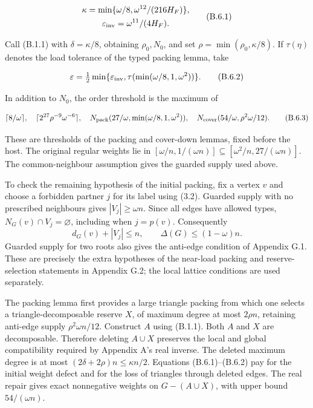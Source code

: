 \documentclass[english,11pt,a4paper]{article}
\begin{document}
\[\begin{gathered}
\kappa=\min\{\omega/8,\omega^{12}/(216H_F)\},\\
\varepsilon_{\rm inv}=\omega^{11}/(4H_F).
\end{gathered}
\tag{B.6.1}\]

Call (B.1.1) with \(\delta=\kappa/8\), obtaining \(\rho_0,N_0\), and set \(\rho=\min(\rho_0,\kappa/8)\). If \(\tau(\eta)\) denotes the load tolerance of the typed packing lemma, take

\[\varepsilon=\tfrac12\min\{\varepsilon_{\rm inv},
\tau(\min(\omega/8,1,\omega^2))\}.
\tag{B.6.2}\]

In addition to \(N_0\), the order threshold is the maximum of

\[\lceil8/\omega\rceil,\quad
\lceil2^{27}\rho^{-9}\omega^{-6}\rceil,\quad
N_{\rm pack}(27/\omega,\min(\omega/8,1,\omega^2)),\quad
N_{\rm cover}(54/\omega,\rho^2\omega/12).
\tag{B.6.3}\]

These are thresholds of the packing and cover-down lemmas, fixed before the host. The original regular weights lie in \([\omega/n,1/(\omega n)]\subseteq[\omega^2/n,27/(\omega n)]\). The common-neighbour assumption gives the guarded supply used above.

To check the remaining hypothesis of the initial packing, fix a vertex \(v\) and choose a forbidden partner \(j\) for its label using (3.2). Guarded supply with no prescribed neighbours gives \(|V_j|\ge\omega n\). Since all edges have allowed types, \(N_G(v)\cap V_j=\varnothing\), including when \(j=p(v)\). Consequently \[d_G(v)+|V_j|\le n,\qquad \Delta(G)\le(1-\omega)n.\] Guarded supply for two roots also gives the anti-edge condition of Appendix G.1. These are precisely the extra hypotheses of the near-load packing and reserve-selection statements in Appendix G.2; the local lattice conditions are used separately.

The packing lemma first provides a large triangle packing from which one selects a triangle-decomposable reserve \(X\), of maximum degree at most \(2\rho n\), retaining anti-edge supply \(\rho^2\omega n/12\). Construct \(A\) using (B.1.1). Both \(A\) and \(X\) are decomposable. Therefore deleting \(A\cup X\) preserves the local and global compatibility required by Appendix A's real inverse. The deleted maximum degree is at most \((2\delta+2\rho)n\le\kappa n/2\). Equations (B.6.1)--(B.6.2) pay for the initial weight defect and for the loss of triangles through deleted edges. The real repair gives exact nonnegative weights on \(G-(A\cup X)\), with upper bound \(54/(\omega n)\).
\end{document}
